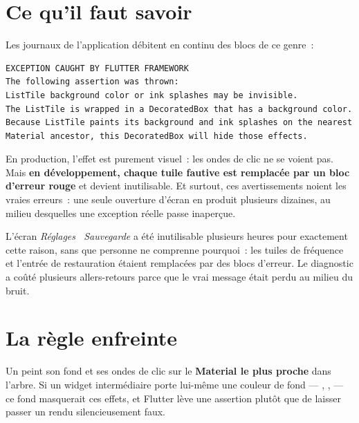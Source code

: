 \documentclass[11pt,a4paper,oneside]{report}
\begin{document}
\chapter*{Ce qu'il faut savoir}
\thispagestyle{plain}

Les journaux de l'application débitent en continu des blocs de ce genre~:

\begin{lstlisting}[style=Alanya, language={}]
EXCEPTION CAUGHT BY FLUTTER FRAMEWORK
The following assertion was thrown:
ListTile background color or ink splashes may be invisible.
The ListTile is wrapped in a DecoratedBox that has a background color.
Because ListTile paints its background and ink splashes on the nearest
Material ancestor, this DecoratedBox will hide those effects.
\end{lstlisting}

\begin{note}
En production, l'effet est purement visuel~: les ondes de clic ne se voient pas.
Mais \textbf{en développement, chaque tuile fautive est remplacée par un bloc
d'erreur rouge} et devient inutilisable. Et surtout, ces avertissements
noient les vraies erreurs~: une seule ouverture d'écran en produit plusieurs
dizaines, au milieu desquelles une exception réelle passe inaperçue.
\end{note}

\begin{alerte}
L'écran \emph{Réglages~\textrightarrow{} Sauvegarde} a été inutilisable
plusieurs heures pour exactement cette raison, sans que personne ne comprenne
pourquoi~: les tuiles de fréquence et l'entrée de restauration étaient
remplacées par des blocs d'erreur. Le diagnostic a coûté plusieurs
allers-retours parce que le vrai message était perdu au milieu du bruit.
\end{alerte}

\tableofcontents

\chapter{La règle enfreinte}

Un  peint son fond et ses ondes de clic sur le \textbf{Material
le plus proche} dans l'arbre. Si un widget intermédiaire porte lui-même une
couleur de fond --- , ,
 --- ce fond masquerait ces effets, et Flutter lève une
assertion plutôt que de laisser passer un rendu silencieusement faux.
\end{document}
